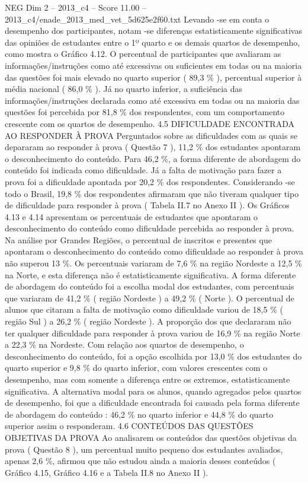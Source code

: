 \begin{textsample}{NEG Dim 2 – 2013\_c4 – Score 11.00 – 2013\_c4/enade\_2013\_med\_vet\_5d625e2f60.txt}
Levando -se em conta o desempenho dos participantes, notam -se diferenças estatisticamente significativas das opiniões de estudantes entre o 1º quarto e os demais quartos de desempenho, como mostra o Gráfico 4.12.
O percentual de participantes que avaliaram as informações/instruções como até excessivas ou suficientes em todas ou na maioria das questões foi mais elevado no quarto superior ( 89,3 \% ), percentual superior à média nacional ( 86,0 \% ).
Já no quarto inferior, a suficiência das informações/instruções declarada como até excessiva em todas ou na maioria das questões foi percebida por 81,8 \% dos respondentes, com um comportamento crescente com os quartos de desempenho. 4.5 DIFICULDADE ENCONTRADA AO RESPONDER À PROVA Perguntados sobre as dificuldades com as quais se depararam ao responder à prova ( Questão 7 ), 11,2 \% dos estudantes apontaram o desconhecimento do conteúdo.
Para 46,2 \%, a forma diferente de abordagem do conteúdo foi indicada como dificuldade.
Já a falta de motivação para fazer a prova foi a dificuldade apontada por 20,2 \% dos respondentes.
Considerando -se todo o Brasil, 19,8 \% dos respondentes afirmaram que não tiveram qualquer tipo de dificuldade para responder à prova ( Tabela II.7 no Anexo II ).
Os Gráficos 4.13 e 4.14 apresentam os percentuais de estudantes que apontaram o desconhecimento do conteúdo como dificuldade percebida ao responder à prova.
Na análise por Grandes Regiões, o percentual de inscritos e presentes que apontaram o desconhecimento do conteúdo como dificuldade ao responder à prova não superou 13 \%.
Os percentuais variaram de 7,6 \% na região Nordeste a 12,5 \% na Norte, e esta diferença não é estatisticamente significativa.
A forma diferente de abordagem do conteúdo foi a escolha modal dos estudantes, com percentuais que variaram de 41,2 \% ( região Nordeste ) a 49,2 \% ( Norte ).
O percentual de alunos que citaram a falta de motivação como dificuldade variou de 18,5 \% ( região Sul ) a 26,2 \% ( região Nordeste ).
A proporção dos que declararam não ter qualquer dificuldade para responder à prova variou de 16,9 \% na região Norte a 22,3 \% na Nordeste.
Com relação aos quartos de desempenho, o desconhecimento do conteúdo, foi a opção escolhida por 13,0 \% dos estudantes do quarto superior e 9,8 \% do quarto inferior, com valores crescentes com o desempenho, mas com somente a diferença entre os extremos, estatisticamente significativa.
A alternativa modal para os alunos, quando agregados pelos quartos de desempenho, foi que a dificuldade encontrada foi causada pela forma diferente de abordagem do conteúdo : 46,2 \% no quarto inferior e 44,8 \% do quarto superior assim o responderam. 4.6 CONTEÚDOS DAS QUESTÕES OBJETIVAS DA PROVA Ao analisarem os conteúdos das questões objetivas da prova ( Questão 8 ), um percentual muito pequeno dos estudantes avaliados, apenas 2,6 \%, afirmou que não estudou ainda a maioria desses conteúdos ( Gráfico 4.15, Gráfico 4.16 e a Tabela II.8 no Anexo II ).

\end{textsample}
